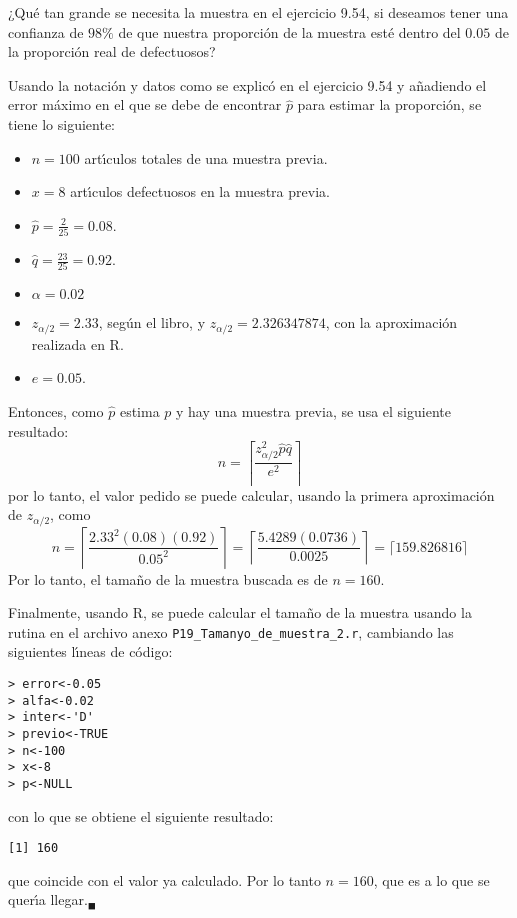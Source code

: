 \begin{enunciado}
 ¿Qu\'e tan grande se necesita la muestra en el ejercicio 9.54, si deseamos tener una confianza de $98\%$ de que nuestra proporci\'on de la muestra est\'e dentro del $0.05$ de la proporci\'on real de defectuosos?
\end{enunciado}

\begin{solucion}
 Usando la notaci\'on y datos como se explic\'o en el ejercicio 9.54 y a\~nadiendo el error m\'aximo en el que se debe de encontrar $\hat{p}$ para estimar la proporci\'on, se tiene lo siguiente:
 \begin{itemize}
  \item $n = 100$ art\'{\i}culos totales de una muestra previa.
  \item $x = 8$ art\'{\i}culos defectuosos en la muestra previa.
  \item $\hat{p} = \frac{2}{25} = 0.08$.
  \item $\hat{q} = \frac{23}{25} = 0.92$.
  \item $\alpha = 0.02$
  \item $z_{\alpha/2} = 2.33$, seg\'un el libro, y $z_{\alpha/2} = 2.326347874$, con la aproximaci\'on realizada en R.
  \item $e = 0.05$.
 \end{itemize}
 Entonces, como $\hat{p}$ estima $p$ y hay una muestra previa, se usa el siguiente resultado:
 \begin{equation*}
  n = \left\lceil \frac{z_{\alpha/2}^2\hat{p}\hat{q}}{e^2} \right\rceil
 \end{equation*}
 por lo tanto, el valor pedido se puede calcular, usando la primera aproximaci\'on de $z_{\alpha/2}$, como
 \begin{equation*}
  n = \left\lceil \frac{2.33^2(0.08)(0.92)}{0.05^2} \right\rceil = \left\lceil \frac{5.4289(0.0736)}{0.0025} \right\rceil = \lceil 159.826816 \rceil
 \end{equation*}
 Por lo tanto, el tama\~no de la muestra buscada es de $n = 160$.
 \par 
 Finalmente, usando R, se puede calcular el tama\~no de la muestra usando la rutina en el archivo anexo \texttt{P19\_Tamanyo\_de\_muestra\_2.r}, cambiando las siguientes l\'{\i}neas de c\'odigo:
 \begin{verbatim}
> error<-0.05
> alfa<-0.02
> inter<-'D'
> previo<-TRUE
> n<-100
> x<-8
> p<-NULL
 \end{verbatim}
 \vspace{-0.5cm}
 con lo que se obtiene el siguiente resultado:
 \begin{verbatim}
[1] 160
 \end{verbatim}
 \vspace{-0.5cm}
 que coincide con el valor ya calculado. Por lo tanto $n=160$, que es a lo que se quer\'{\i}a llegar.${}_{\blacksquare}$
\end{solucion}
